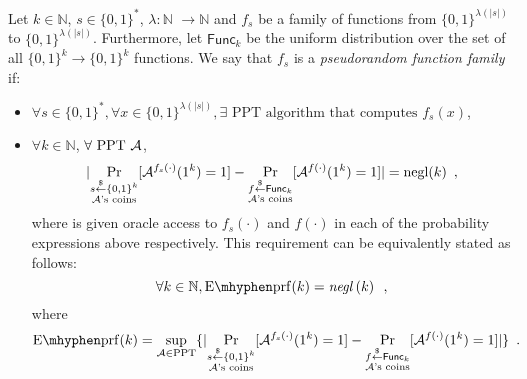   \begin{definition}
    \label{def:prf:secure}
    Let $k \in \mathbb{N}$, $s \in \{0, 1\}^*$, $\lambda: \mathbb{N}$
    $\rightarrow \mathbb{N}$ and $f_s$ be a family of functions from $\{0,
    1\}^{\lambda(|s|)}$ to $\{0, 1\}^{\lambda(|s|)}$. Furthermore, let
    $\mathsf{Func}_k$ be the uniform distribution over the set of all $\{0,
    1\}^k \rightarrow \{0, 1\}^k$ functions. We say that $f_s$ is a
    \emph{pseudorandom function family} if:
    \begin{itemize}
      \item $\forall s \in \{0, 1\}^*, \forall x \in \{0, 1\}^{\lambda(|s|)},
      \exists \text { PPT algorithm that computes } f_s(x)$,
      \item $\forall k \in \mathbb{N}$, $\forall \text{ PPT } \mathcal{A}$,
      \begin{equation*}
        |\underset{\substack{s \overset{\$}{\gets} \{0, 1\}^k \\
        \mathcal{A}\text{'s coins}}}{\Pr}[\mathcal{A}^{f_s(\cdot)}(1^k) = 1] -
        \underset{\substack{f \overset{\$}{\gets} \mathsf{Func}_k \\
        \mathcal{A}\text{'s coins}}}{\Pr}[\mathcal{A}^{f(\cdot)}(1^k) = 1]| =
        \text{negl}(k) \enspace,
      \end{equation*}
      where \adversary{} is given oracle access to $f_s(\cdot)$ and $f(\cdot)$
      in each of the probability expressions above respectively. This
      requirement can be equivalently stated as follows:
      \begin{equation*}
        \forall k \in \mathbb{N}, \mathrm{E \mhyphen prf}(k) =
        \mathit{negl}\left(k\right) \enspace,
      \end{equation*}
      where
      \begin{equation*}
        \mathrm{E \mhyphen prf}(k) = \underset{\adversary \in
        \text{PPT}}{\sup}\{|\underset{\substack{s \overset{\$}{\gets} \{0, 1\}^k
        \\ \adversary\text{'s coins}}}{\Pr}[\adversary^{f_s(\cdot)}(1^k) = 1] -
        \underset{\substack{f \overset{\$}{\gets} \mathsf{Func}_k \\
        \adversary\text{'s coins}}}{\Pr}[\adversary^{f(\cdot)}(1^k) = 1]|\}
        \enspace.
      \end{equation*}
    \end{itemize}
  \end{definition}
